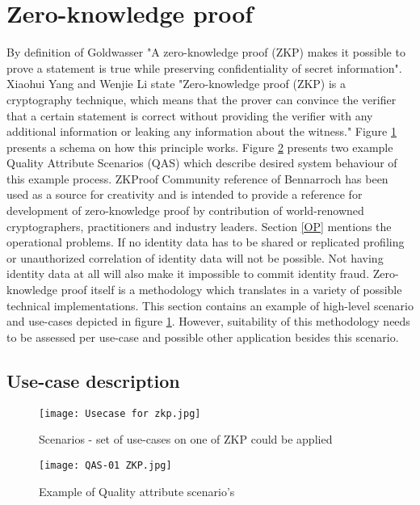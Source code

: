\section{Zero-knowledge proof}
By definition of Goldwasser \etal \cite{Goldwasser} "A zero-knowledge proof (ZKP) makes it possible to prove a statement is true while preserving confidentiality of secret information". 
Xiaohui Yang and Wenjie Li \cite{YANG2020102050} state "Zero-knowledge proof (ZKP) is a cryptography technique, which means that the prover can convince the verifier that a certain statement is correct without providing the verifier with any additional information or leaking any information about the witness." Figure \ref{fig:ZKP_usecase} presents a schema on how this principle works. Figure \ref{fig:QAS01} presents two example Quality Attribute Scenarios (QAS) which describe desired system behaviour of this example process. ZKProof Community reference \cite{2019:zkproof:community-reference-0.2} of Bennarroch \etal has been used as a source for creativity and is intended to provide a reference for development of zero-knowledge proof by contribution of world-renowned cryptographers, practitioners and industry leaders. Section \ref{OP} mentions the operational problems. If no identity data has to be shared or replicated profiling or unauthorized correlation of identity data will not be possible. Not having identity data at all will also make it impossible to commit identity fraud. 
Zero-knowledge proof itself is a methodology which translates in a variety of possible technical implementations. This section contains an example of high-level scenario and use-cases depicted in figure \ref{fig:ZKP_usecase}. However, suitability of this methodology needs to be assessed per use-case and possible other application besides this scenario. 

\subsection{Use-case description}
\graphicspath{ {./images/} }
\begin{figure}
\centering
\label{fig:ZKP_usecase}
\texttt{[image: Usecase for zkp.jpg]}\\
\caption{Scenarios - set of use-cases on one of ZKP could be applied}
\end{figure}

\graphicspath{ {./images/} }
\begin{figure}
\centering
\label{fig:QAS01}
\texttt{[image: QAS-01 ZKP.jpg]}\\
\caption{Example of Quality attribute scenario's}
\end{figure}

